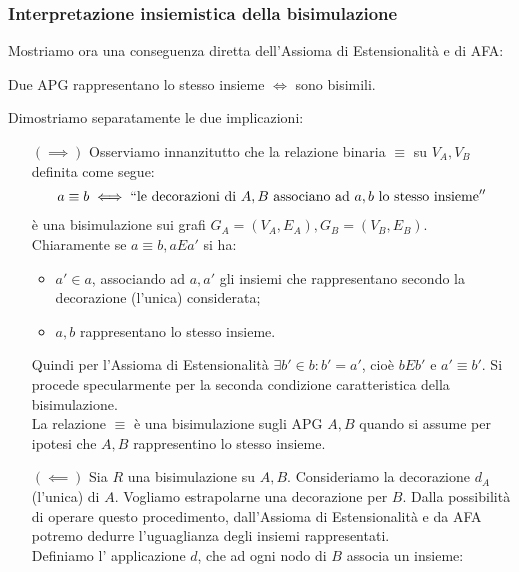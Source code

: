 \subsubsection{Interpretazione insiemistica della bisimulazione}
Mostriamo ora una conseguenza diretta dell'Assioma di Estensionalità e di AFA:
\begin{theorem}
    Due APG rappresentano lo stesso insieme $\iff$ sono bisimili.
    \label{theo:bisi_iff_eqsets}
\end{theorem}
\begin{proof2}
    Dimostriamo separatamente le due implicazioni:
    \begin{enumerate}
        \item[$(\implies)$] Osserviamo innanzitutto che la relazione binaria $\equiv$ su $V_A, V_B$ definita come segue:
              \begin{gather*}
                  a \equiv b \iff ``\text{le decorazioni di } A,B \text{ associano ad } a,b \text{ lo stesso insieme}''
              \end{gather*}
              è una bisimulazione sui grafi $G_A = (V_A, E_A), G_B = (V_B, E_B)$.\\
              Chiaramente se $a \equiv b, a E a'$ si ha:
              \begin{itemize}
                  \item $a' \in a$, associando ad $a,a'$ gli insiemi che rappresentano secondo la decorazione (l'unica) considerata;
                  \item $a,b$ rappresentano lo stesso insieme.
              \end{itemize}
              Quindi per l'Assioma di Estensionalità $\exists b' \in b: b' = a'$, cioè $b E b'$ e $a' \equiv b'$. Si procede specularmente per la seconda condizione caratteristica della bisimulazione.\\
              La relazione $\equiv$ è una bisimulazione sugli APG $A,B$ quando si assume per ipotesi che $A,B$ rappresentino lo stesso insieme.
        \item[$(\impliedby)$] Sia $R$ una bisimulazione su $A,B$. Consideriamo la decorazione $d_A$ (l'unica) di $A$. Vogliamo estrapolarne una decorazione per $B$. Dalla possibilità di operare questo procedimento, dall'Assioma di Estensionalità e da AFA potremo dedurre l'uguaglianza degli insiemi rappresentati.\\
              Definiamo l' applicazione $d$, che ad ogni nodo di $B$ associa un insieme:
              \begin{gather*}

\end{gather*}
\end{enumerate}
\end{proof2}
